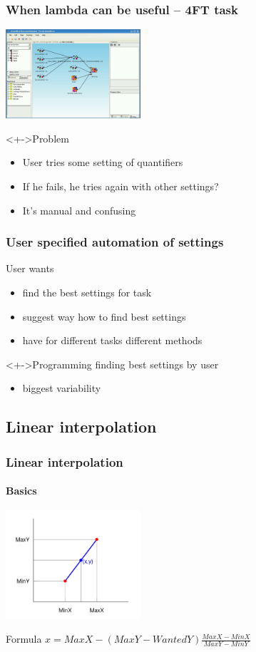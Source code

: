 \documentclass{beamer}
\begin{document}
\begin{frame}
	\frametitle{When lambda can be useful -- 4FT task}
	\includegraphics[width=5cm]{exampleMotivation1}
	\begin{block}<+->{Problem}
		\begin{itemize}[<+->]
			\item User tries some setting of quantifiers
			\item If he fails, he tries again with other settings?
			\item It's manual and confusing
		\end{itemize}	
	\end{block}
\end{frame}

\begin{frame}
	\frametitle{User specified automation of settings}
	\begin{block}{User wants}
		\begin{itemize}[<+->]
			\item find the best settings for task
			\item suggest way how to find best settings
			\item have for different tasks different methods
		\end{itemize}
	\end{block}
	\begin{block}<+->{Programming finding best settings by user}
		\begin{itemize}[<+->]
			\item biggest variability
		\end{itemize}
	\end{block}

\end{frame}

\subsection{Linear interpolation}
\begin{frame}
	\frametitle{Linear interpolation}
	\framesubtitle{Basics}
	
	\includegraphics[width=5cm]{linearInterpolationPlot}
	\begin{block}{Formula}
		$x = MaxX - (MaxY-WantedY)\frac{MaxX - MinX}{MaxY - MinY}$
	\end{block}
\end{frame}
\end{document}
